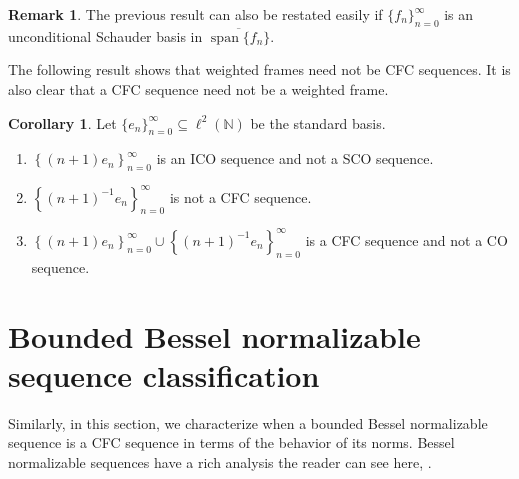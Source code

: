 \documentclass[11pt]{amsart}
\theoremstyle{definition}
\newtheorem{cor}{Corollary}[section]
\newtheorem{rem}[thm]{Remark}
\numberwithin{equation}{section}
\begin{document}
\begin{rem}
The previous result can also be restated easily if  $\{f_n\}_{n=0}^{\infty}$ is an unconditional Schauder basis in $\overline{\operatorname{span}\{f_n\}}$.
\end{rem}

The following result shows that weighted frames need not be CFC sequences. It is also clear that a CFC sequence need not be a weighted frame. 
\begin{cor}
Let $\{e_n\}_{n=0}^{\infty}\subseteq \ell^{2}(\mathbb{N})$ be the standard basis.
\begin{enumerate}
    \item $\left\{(n+1)e_{n} \right\}_{n=0}^{\infty}$ is an ICO sequence and not a SCO sequence.
    \item  $\left\{(n+1)^{-1}e_{n} \right \}_{n=0}^{\infty}$ is not a CFC sequence.
    \item $\left\{(n+1)e_{n} \right\}_{n=0}^{\infty}\cup \left\{(n+1)^{-1}e_{n} \right \}_{n=0}^{\infty}$ is a CFC sequence and not a CO sequence.
\end{enumerate}
\end{cor}

\section{Bounded Bessel normalizable sequence classification}\label{6}
Similarly, in this section, we characterize when a bounded Bessel normalizable sequence is a CFC sequence in terms of the behavior of its norms. Bessel normalizable sequences have a rich analysis the reader can see here, \cite{Yu2024Frame-normalizable}.
\end{document}
